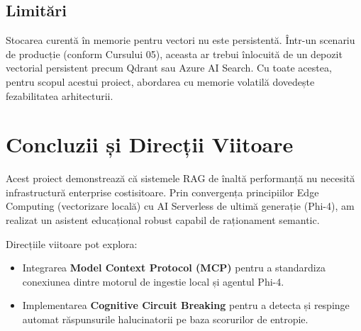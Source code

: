 \documentclass[conference]{IEEEtran}
\begin{document}
\subsection{Limitări}
Stocarea curentă în memorie pentru vectori nu este persistentă. Într-un scenariu de producție (conform Cursului 05), aceasta ar trebui înlocuită de un depozit vectorial persistent precum Qdrant sau Azure AI Search. Cu toate acestea, pentru scopul acestui proiect, abordarea cu memorie volatilă dovedește fezabilitatea arhitecturii.

\section{Concluzii și Direcții Viitoare}

Acest proiect demonstrează că sistemele RAG de înaltă performanță nu necesită infrastructură enterprise costisitoare. Prin convergența principiilor Edge Computing (vectorizare locală) cu AI Serverless de ultimă generație (Phi-4), am realizat un asistent educațional robust capabil de raționament semantic.

Direcțiile viitoare pot explora:
\begin{itemize}
    \item Integrarea \textbf{Model Context Protocol (MCP)} \cite{mcp_paper} pentru a standardiza conexiunea dintre motorul de ingestie local și agentul Phi-4.
    \item Implementarea \textbf{Cognitive Circuit Breaking} \cite{curs10} pentru a detecta și respinge automat răspunsurile halucinatorii pe baza scorurilor de entropie.
\end{itemize}
\end{document}
